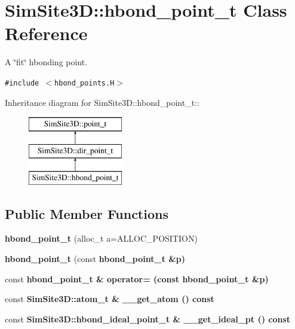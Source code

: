 \section{SimSite3D::hbond\_\-point\_\-t Class Reference}
\label{classSimSite3D_1_1hbond__point__t}
A \char`\"{}fit\char`\"{} hbonding point.  


{\tt \#include $<$hbond\_\-points.H$>$}

Inheritance diagram for SimSite3D::hbond\_\-point\_\-t::\begin{figure}[H]
\begin{center}
\leavevmode
\includegraphics[height=3cm]{classSimSite3D_1_1hbond__point__t}
\end{center}
\end{figure}
\subsection*{Public Member Functions}
\begin{CompactItemize}
\item 
\textbf{hbond\_\-point\_\-t} (alloc\_\-t a=ALLOC\_\-POSITION)\label{classSimSite3D_1_1hbond__point__t_5fab75a5579f51c63612ddb147c3eb0a}

\item 
\textbf{hbond\_\-point\_\-t} (const \bf{hbond\_\-point\_\-t} \&p)\label{classSimSite3D_1_1hbond__point__t_a0e83b45350073eb28ceefc0c995861c}

\item 
const \bf{hbond\_\-point\_\-t} \& \textbf{operator=} (const \bf{hbond\_\-point\_\-t} \&p)\label{classSimSite3D_1_1hbond__point__t_c77fa3dc05e58c6cede53e560f663291}

\item 
const \bf{SimSite3D::atom\_\-t} \& \textbf{\_\-\_\-get\_\-atom} () const \label{classSimSite3D_1_1hbond__point__t_faf40b7877ec78b4a2e134369fb5e8cf}

\item 
const \bf{SimSite3D::hbond\_\-ideal\_\-point\_\-t} \& \textbf{\_\-\_\-get\_\-ideal\_\-pt} () const \label{classSimSite3D_1_1hbond__point__t_ed40f565437b493c187f56297417d2ec}

\end{CompactItemize}
